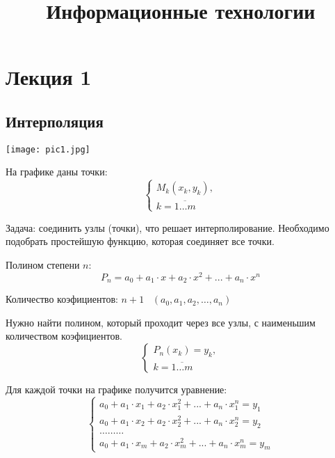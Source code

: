 \documentclass[12pt]{article}
\title{Информационные технологии}
\begin{document}
\maketitle
\newpage

\section{Лекция 1}

\subsection{Интерполяция}
\begin{center}
	\texttt{[image: pic1.jpg]}
\end{center}

На графике даны точки:
\begin{equation*}
	\begin{cases}
		M_k (x_k, y_k), \\
		k = \overline{1 \ldots m}
	\end{cases}
\end{equation*}

Задача: соединить узлы (точки), что решает интерполирование.
Необходимо подобрать простейшую функцию, которая соединяет все точки.

Полином степени \( n \):
\[  P_n = a_0 + a_1 \cdot x + a_2 \cdot x^2 + ... + a_n \cdot x^n \]

Количество коэфициентов:
\( n + 1 \hspace{10pt} (a_0, a_1, a_2, \ldots , a_n) \)

Нужно найти полином, который проходит через все узлы, с наименьшим количеством
коэфициентов.
\begin{equation*}
	\begin{cases}
		P_n(x_k) = y_k, \\
		k= \overline{1 \ldots m}
	\end{cases}
\end{equation*}

Для каждой точки на графике получится уравнение:
\begin{equation*}
	\begin{cases}
		a_0 + a_1 \cdot x_1 + a_2 \cdot x_1^2 + ... + a_n \cdot x_1^n = y_1 \\
		a_0 + a_1 \cdot x_2 + a_2 \cdot x_2^2 + ... + a_n \cdot x_2^n = y_2 \\
		\ldots \ldots \ldots                                                \\
		a_0 + a_1 \cdot x_m + a_2 \cdot x_m^2 + ... + a_n \cdot x_m^n = y_m
	\end{cases}
\end{equation*}
\end{document}
